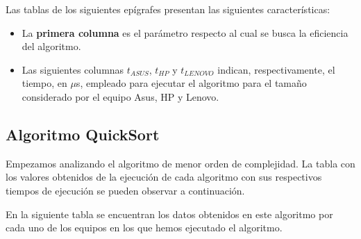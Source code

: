 \documentclass{homework}
\begin{document}
    Las tablas de los siguientes epígrafes presentan las siguientes características:

    \begin{itemize}
        \item La \textbf{primera columna} es el parámetro respecto al cual se busca la eficiencia del algoritmo.
        \item Las siguientes columnas $t_{ASUS}$, $t_{HP}$ y $t_{LENOVO}$ indican, respectivamente, el tiempo, en $\mu$s, empleado para ejecutar el algoritmo para el 
        tamaño considerado por el equipo Asus, HP y Lenovo.
    \end{itemize}

    \newpage

    \subsection{Algoritmo QuickSort}

    Empezamos analizando el algoritmo de menor orden de complejidad. La tabla con los valores obtenidos de la ejecución
    de cada algoritmo con sus respectivos tiempos de ejecución se pueden observar a continuación.

    En la siguiente tabla se encuentran los datos obtenidos en este algoritmo por cada uno de los
    equipos en los que hemos ejecutado el algoritmo. 
\end{document}

